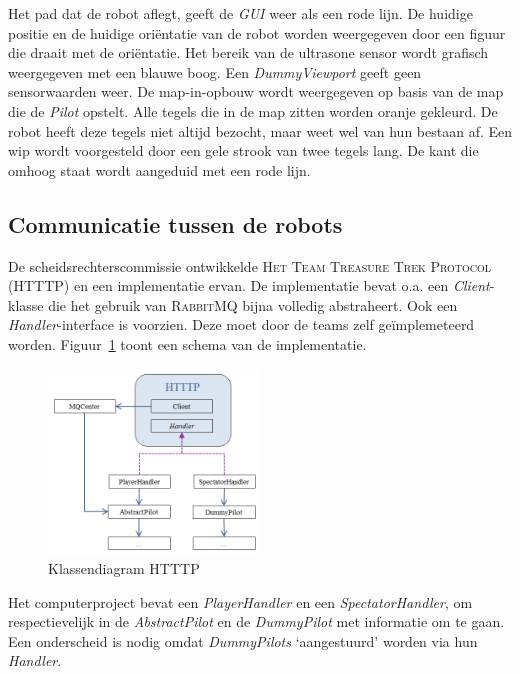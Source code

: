 \documentclass[eind]{penoverslag}
\begin{document}
Het pad dat de robot aflegt, geeft de \textit{GUI} weer als een rode lijn. De huidige positie en de huidige ori\"entatie van de robot worden weergegeven door een figuur die draait met de ori\"entatie. Het bereik van de ultrasone sensor wordt grafisch weergegeven met een blauwe boog. Een \textit{DummyViewport} geeft geen sensorwaarden weer. De map-in-opbouw wordt weergegeven op basis van de map die de \textit{Pilot} opstelt. Alle tegels die in de map zitten worden oranje gekleurd. De robot heeft deze tegels niet altijd bezocht, maar weet wel van hun bestaan af. Een wip wordt voorgesteld door een gele strook van twee tegels lang. De kant die omhoog staat wordt aangeduid met een rode lijn.\\

\subsection{Communicatie tussen de robots}
\label{ssec:RabbMQ}
De scheidsrechterscommissie ontwikkelde \textsc{Het Team Treasure Trek Protocol (HTTTP)} en een implementatie ervan. De implementatie bevat o.a. een \textit{Client}-klasse die het gebruik van \textsc{RabbitMQ} bijna volledig abstraheert. Ook een \textit{Handler}-interface is voorzien. Deze moet door de teams zelf ge\"implemeteerd worden. Figuur~\ref{fig:klasHTTTP} toont een schema van de implementatie.\\

\begin{figure}[h]
\centering
	\includegraphics[width=0.5\textwidth]{KlasHTTTP}
\caption{Klassendiagram HTTTP}
\label{fig:klasHTTTP}
\end{figure}

Het computerproject bevat een \textit{PlayerHandler} en een \textit{SpectatorHandler}, om respectievelijk in de \textit{AbstractPilot} en de \textit{DummyPilot} met informatie om te gaan. Een onderscheid is nodig omdat \textit{DummyPilots} `aangestuurd' worden via hun \textit{Handler}.\\
\end{document}

